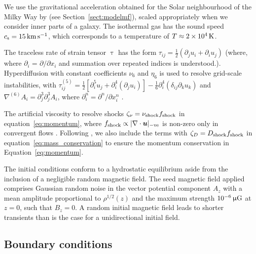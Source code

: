 \documentclass[fleqn,usenatbib]{mnras}
\newcommand\sound{_\text{s}} %
\renewcommand\vec[1]{\bm{#1}}%
\newcommand{\km}{\,{\rm km}}    %
\newcommand{\s}{\,{\rm s}}      %
\newcommand{\kms}{\km\s^{-1}}    %
\newcommand{\mkG}{\,\upmu{\rm G}} %
\newcommand{\K}{\,{\rm K}}      %
\begin{document}
We use the gravitational acceleration obtained for the Solar neighbourhood of
the Milky Way by \citet{K&G1989MNRAS} (see Section~\ref{sect:modelmf}), scaled
appropriately when we consider inner parts of a galaxy. The isothermal gas has
the sound speed $c\sound = 15 \kms$, which corresponds to a temperature of $T
\approx 2\times 10^4\K$.

The traceless rate of strain tensor $\uptau$ has the form $\tau_{ij} =
\frac{1}{2}(\partial_j u_i + \partial_i u_j)$ (where, where $\partial_i$ =
$\partial/\partial x_{i}$ and summation over repeated indices is understood.).
Hyperdiffusion with constant coefficients $\nu_6$ and $\eta_6$ is used to
resolve grid-scale instabilities, with $\tau_{ij}^{(5)} = \frac{1}{2}\left[
\partial^5_i u_j + \partial^4_i(\partial_j u_i) \right] -
\frac{1}{6}\partial^4_i(\delta_{ij}\partial_k u_k)$ and $\nabla^{(6)} A_i =
\partial^3_j\partial^3_j A_i$, where $\partial_i^n = \partial^n/\partial x^n_i$
\citep{ABSG2002,Gent2021}.

The artificial viscosity to resolve shocks $\zeta_\nu = \nu_{\rm shock}f_{\rm
shock}$ in equation~\eqref{eq:momentum}, where $f_{\rm shock} \propto |\nabla
\cdot \vec{u}|_{-\rm ve}$ is non-zero only in convergent flows \citep[see,
e.g.,][]{Gent2020}.  Following \citet{Gent2020}, we also include the terms with
$\zeta_D=D_{\rm shock}f_{\rm shock}$ in equation~\eqref{eq:mass_conservation}
to ensure the momentum conservation in Equation~\eqref{eq:momentum}.

The initial conditions conform to a hydrostatic equilibrium aside from the
inclusion of a negligible random magnetic field.  The seed magnetic field
applied comprises Gaussian random noise in the vector potential component $A_z$
with a mean amplitude proportional to $\rho^{1/2}(z)$ and the maximum strength
$10^{-6}\mkG$ at $z=0$, such that $B_z=0$. A random initial magnetic field
leads to shorter transients than is the case for a unidirectional initial
field.

\subsection{Boundary conditions}
\end{document}
